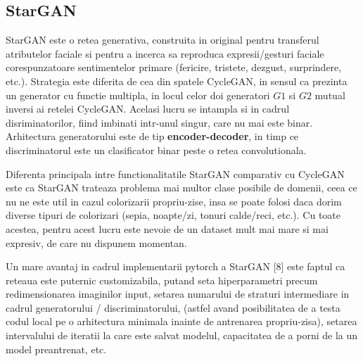 \documentclass[12pt]{article}
\theoremstyle{definition}
\begin{document}
\subsection{StarGAN}

StarGAN este o retea generativa, construita in original pentru transferul atributelor faciale si pentru a incerca sa reproduca expresii/gesturi faciale corespunzatoare sentimentelor primare (fericire, tristete, dezgust, surprindere, etc.). Strategia este diferita de cea din spatele CycleGAN, in sensul ca prezinta un generator cu functie multipla, in locul celor doi generatori $G1$ si $G2$ mutual inversi ai retelei CycleGAN. Acelasi lucru se intampla si in cadrul disriminatorilor, fiind imbinati intr-unul singur, care nu mai este binar. Arhitectura generatorului este de tip \textbf{encoder-decoder}, in timp ce discriminatorul este un clasificator binar peste o retea convolutionala.

Diferenta principala intre functionalitatile StarGAN comparativ cu CycleGAN este ca StarGAN trateaza problema mai multor clase posibile de domenii, ceea ce nu ne este util in cazul colorizarii propriu-zise, insa se poate folosi daca dorim diverse tipuri de colorizari (sepia, noapte/zi, tonuri calde/reci, etc.). Cu toate acestea, pentru acest lucru este nevoie de un dataset mult mai mare si mai expresiv, de care nu dispunem momentan.

Un mare avantaj in cadrul implementarii pytorch a StarGAN [8] este faptul ca reteaua este puternic customizabila, putand seta hiperparametri precum redimensionarea imaginilor input, setarea numarului de straturi intermediare in cadrul generatorului / discriminatorului, (astfel avand posibilitatea de a testa codul local pe o arhitectura minimala inainte de antrenarea propriu-zisa), setarea intervalului de iteratii la care este salvat modelul, capacitatea de a porni de la un model preantrenat, etc.
\end{document}
